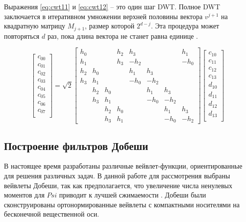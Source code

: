 Выражения \ref{eq:cwt11} и \ref{eq:cwt12} – это один шаг DWT. Полное DWT заключается в итеративном умножении верхней половины вектора $v^{j+1}$ 
на квадратную матрицу $M_{j+1}$, размер которой $2^{d-j}$. Эта процедура может повторяться $d$ раз, пока длина вектора не станет равна единице \cite{Pup04}. 

\begin{equation}\label{eq:dwt2}
\begin{bmatrix} 
c_{00} \\ c_{01} \\c_{02} \\c_{03} \\c_{04} \\c_{05} \\c_{06} \\c_{07} \\
\end{bmatrix}
=
\sqrt{2}
\begin{bmatrix} 

h_{0} &       &       & h_{2} & h_{3} &       &       & h_{1} \\
h_{1} &       &       & h_{3} &-h_{2} &       &       &-h_{0} \\
h_{2} & h_{0} &       &       & h_{1} & h_{3} &       &       \\
h_{3} & h_{1} &       &       &-h_{0} &-h_{2} &       &       \\
      & h_{2} & h_{0} &       &       & h_{1} & h_{3} &       \\
      & h_{3} & h_{1} &       &       &-h_{0} &-h_{2} &       \\
      &       & h_{2} & h_{0} &       &       & h_{1} & h_{3} \\
      &       & h_{3} & h_{1} &       &       &-h_{0} &-h_{2} 

\end{bmatrix}
\begin{bmatrix} 
c_{10} \\ c_{11} \\c_{12} \\c_{13} \\d_{10} \\d_{11} \\d_{12} \\d_{13} \\
\end{bmatrix}
\end{equation}


\subsection{Построение фильтров Добеши}
В настоящее время разработаны различные вейвлет-функции, ориентированные для решения различных задач. 
В данной работе для рассмотрения выбраны вейвлеты Добеши, так как предполагается, что увеличение числа 
ненулевых моментов для $Psi$ приводит к лучшей сжимаемости \cite{Pup01}. Добеши были сконструированы ортонормированные вейвлеты с компактными носителями на бесконечной вещественной оси.

